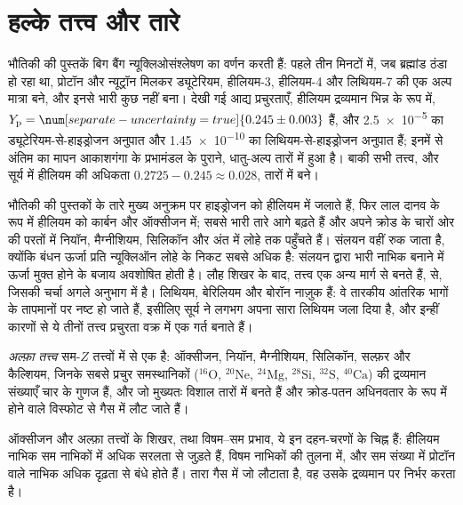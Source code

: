 \section{हल्के तत्त्व और तारे}\label{sec:b3:origin-of-elements:stars}

भौतिकी की पुस्तकें बिग बैंग न्यूक्लिओसंश्लेषण का वर्णन करती हैं: पहले तीन
मिनटों में, जब ब्रह्मांड ठंडा हो रहा था, प्रोटॉन और न्यूट्रॉन मिलकर
ड्यूटेरियम, हीलियम-3, हीलियम-4 और लिथियम-7 की एक अल्प मात्रा बने, और इनसे भारी कुछ नहीं
बना। देखी गई आद्य प्रचुरताएँ, हीलियम द्रव्यमान भिन्न के रूप में,
$Y_\mathrm{p} = \num[separate-uncertainty=true]{0.245 \pm 0.003}$ हैं, और
\num{2.5e-5} का ड्यूटेरियम-से-हाइड्रोजन अनुपात और
\num{1.45e-10} का लिथियम-से-हाइड्रोजन अनुपात हैं; इनमें से अंतिम का मापन
आकाशगंगा के प्रभामंडल के पुराने, धातु-अल्प तारों में हुआ है। बाकी सभी तत्त्व, और
सूर्य में हीलियम की अधिकता $0.2725 - 0.245 \approx 0.028$, तारों में बने।

भौतिकी की पुस्तकों के तारे मुख्य अनुक्रम पर हाइड्रोजन को हीलियम में जलाते हैं,
फिर लाल दानव के रूप में हीलियम को कार्बन और ऑक्सीजन में; सबसे भारी
तारे आगे बढ़ते हैं और अपने क्रोड के चारों ओर की परतों में नियॉन, मैग्नीशियम,
सिलिकॉन और अंत में लोहे तक पहुँचते हैं। संलयन वहीं रुक जाता है, क्योंकि बंधन ऊर्जा
प्रति न्यूक्लिऑन लोहे के निकट सबसे अधिक है: संलयन द्वारा भारी नाभिक बनाने में
ऊर्जा मुक्त होने के बजाय अवशोषित होती है। लौह शिखर के बाद,
तत्त्व एक अन्य मार्ग से बनते हैं,  से,
जिसकी चर्चा अगले अनुभाग में है। लिथियम, बेरिलियम और बोरॉन नाज़ुक हैं:
वे तारकीय आंतरिक भागों के तापमानों पर नष्ट हो जाते हैं, इसीलिए
सूर्य ने लगभग अपना सारा लिथियम जला दिया है, और इन्हीं कारणों से ये तीनों तत्त्व
प्रचुरता वक्र में एक गर्त बनाते हैं।

\begin{definition}[अल्फ़ा तत्त्व]\label{def:b3:origin-of-elements:alpha}
\emph{अल्फ़ा तत्त्व} सम-$Z$ तत्त्वों में से एक है: ऑक्सीजन,
नियॉन, मैग्नीशियम, सिलिकॉन, सल्फ़र और कैल्शियम, जिनके
सबसे प्रचुर समस्थानिकों ($^{16}\mathrm{O}$, $^{20}\mathrm{Ne}$,
$^{24}\mathrm{Mg}$, $^{28}\mathrm{Si}$, $^{32}\mathrm{S}$,
$^{40}\mathrm{Ca}$) की द्रव्यमान संख्याएँ चार के गुणज हैं,
और जो मुख्यतः विशाल तारों में बनते हैं और
क्रोड-पतन अधिनवतार के रूप में होने वाले विस्फोट से गैस में लौट जाते हैं।
\end{definition}

ऑक्सीजन और अल्फ़ा तत्त्वों के शिखर, तथा विषम--सम प्रभाव,
ये इन दहन-चरणों के चिह्न हैं: हीलियम नाभिक सम नाभिकों में अधिक सरलता से
जुड़ते हैं, विषम नाभिकों की तुलना में, और सम संख्या में प्रोटॉन वाले नाभिक
अधिक दृढ़ता से बंधे होते हैं। तारा गैस में जो लौटाता है,
वह उसके द्रव्यमान पर निर्भर करता है।

